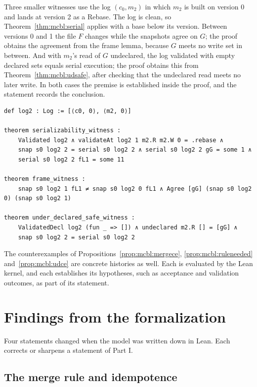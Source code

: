 \documentclass[11pt,letterpaper]{article}
\theoremstyle{definition}
\theoremstyle{remark}
\begin{document}
Three smaller witnesses use the log $(c_0,m_2)$ in which $m_2$ is built on version 0 and lands at version 2 as a Rebase. The log is clean, so Theorem~\ref{thm:mcbl:serial} applies with a base below its version. Between versions 0 and 1 the file $F$ changes while the snapshots agree on $G$; the proof obtains the agreement from the frame lemma, because $G$ meets no write set in between. And with $m_2$'s read of $G$ undeclared, the log validated with empty declared sets equals serial execution; the proof obtains this from Theorem~\ref{thm:mcbl:udsafe}, after checking that the undeclared read meets no later write. In both cases the premise is established inside the proof, and the statement records the conclusion.

\begin{lstlisting}[language=Lean,caption={Witnesses for serializability, frame and under-declared safety (\texttt{YonedaTx/Witnesses.lean})},label={lst:mcbl:wother}]
def log2 : Log := [⟨c0, 0⟩, ⟨m2, 0⟩]

theorem serializability_witness :
    Validated log2 ∧ validateAt log2 1 m2.R m2.W 0 = .rebase ∧
    snap s0 log2 2 = serial s0 log2 2 ∧ serial s0 log2 2 gG = some 1 ∧
    serial s0 log2 2 fL1 = some 11

theorem frame_witness :
    snap s0 log2 1 fL1 ≠ snap s0 log2 0 fL1 ∧ Agree [gG] (snap s0 log2 0) (snap s0 log2 1)

theorem under_declared_safe_witness :
    ValidatedDecl log2 (fun _ => []) ∧ undeclared m2.R [] = [gG] ∧
    snap s0 log2 2 = serial s0 log2 2
\end{lstlisting}

The counterexamples of Propositions~\ref{prop:mcbl:mergece}, \ref{prop:mcbl:ruleneeded} and~\ref{prop:mcbl:udce} are concrete histories as well. Each is evaluated by the Lean kernel, and each establishes its hypotheses, such as acceptance and validation outcomes, as part of its statement.

\section{Findings from the formalization}
\label{sec:mcbl:findings}

Four statements changed when the model was written down in Lean. Each corrects or sharpens a statement of Part I.

\subsection{The merge rule and idempotence}
\end{document}
